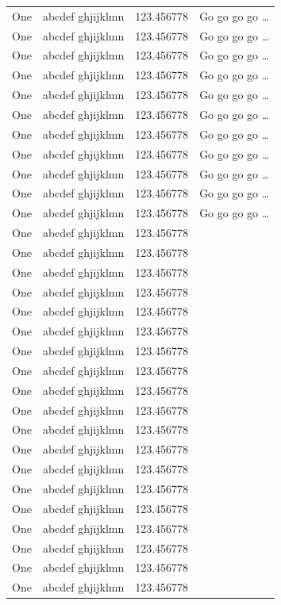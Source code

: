 \documentclass[phd,showframe]{ndsu-thesis-2022}
\begin{document}
\begin{longtable}{l l l l}
One & abcdef ghjijklmn & 123.456778  & Go go go go \ldots \\
One & abcdef ghjijklmn & 123.456778  & Go go go go \ldots \\
One & abcdef ghjijklmn & 123.456778  & Go go go go \ldots \\
One & abcdef ghjijklmn & 123.456778  & Go go go go \ldots \\
One & abcdef ghjijklmn & 123.456778  & Go go go go \ldots \\
One & abcdef ghjijklmn & 123.456778  & Go go go go \ldots \\
One & abcdef ghjijklmn & 123.456778  & Go go go go \ldots \\
One & abcdef ghjijklmn & 123.456778  & Go go go go \ldots \\
One & abcdef ghjijklmn & 123.456778  & Go go go go \ldots \\
One & abcdef ghjijklmn & 123.456778  & Go go go go \ldots \\
One & abcdef ghjijklmn & 123.456778  & Go go go go \ldots \\
One & abcdef ghjijklmn & 123.456778 \\
One & abcdef ghjijklmn & 123.456778 \\
One & abcdef ghjijklmn & 123.456778 \\
One & abcdef ghjijklmn & 123.456778 \\
One & abcdef ghjijklmn & 123.456778 \\
One & abcdef ghjijklmn & 123.456778 \\
One & abcdef ghjijklmn & 123.456778 \\
One & abcdef ghjijklmn & 123.456778 \\
One & abcdef ghjijklmn & 123.456778 \\
One & abcdef ghjijklmn & 123.456778 \\
One & abcdef ghjijklmn & 123.456778 \\
One & abcdef ghjijklmn & 123.456778 \\
One & abcdef ghjijklmn & 123.456778 \\
One & abcdef ghjijklmn & 123.456778 \\
One & abcdef ghjijklmn & 123.456778 \\
One & abcdef ghjijklmn & 123.456778 \\
One & abcdef ghjijklmn & 123.456778 \\
One & abcdef ghjijklmn & 123.456778 \\
One & abcdef ghjijklmn & 123.456778 \\

\end{longtable}
\end{document}
